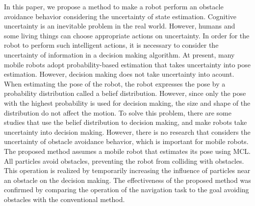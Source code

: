In this paper, we propose a method to make a robot perform an obstacle avoidance behavior considering the uncertainty of state estimation.
Cognitive uncertainty is an inevitable problem in the real world.
However, humans and some living things can choose appropriate actions on uncertainty.
In order for the robot to perform such intelligent actions, it is necessary to consider the uncertainty of information in a decision making algorithm.
At present, many mobile robots adopt probability-based estimation that takes uncertainty into pose estimation.
However, decision making does not take uncertainty into acount.
When estimating the pose of the robot, the robot expresses the pose by a probability distribution called a belief distribution.
However, since only the pose with the highest probability is used for decision making, the size and shape of the distribution do not affect the motion.
To solve this problem, there are some studies that use the belief distribution to decision making, and make robots take uncertainty into decision making.
However, there is no research that considers the uncertainty of obstacle avoidance behavior, which is important for mobile robots.
The proposed method assumes a mobile robot that estimates its pose using MCL.
All particles avoid obstacles, preventing the robot from colliding with obstacles.
This operation is realized by temporarily increasing the influence of particles near an obstacle on the decision making.
The effectiveness of the proposed method was confirmed by comparing the operation of the navigation task to the goal avoiding obstacles with the conventional method.

